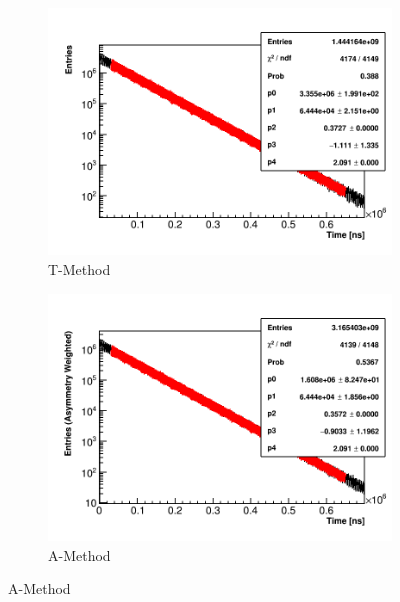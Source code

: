 \begin{figure}[]
\centering
    \begin{subfigure}[t]{0.45\textwidth}
        \centering
        \includegraphics[width=\textwidth]{Example_TMethod_Fit}
        \caption{T-Method}
    \end{subfigure}
    \hspace{1mm}
    \begin{subfigure}[t]{0.45\textwidth}
        \centering
        \includegraphics[width=\textwidth]{Example_AMethod_Fit}
        \caption{A-Method}
    \end{subfigure}%


\end{figure}
